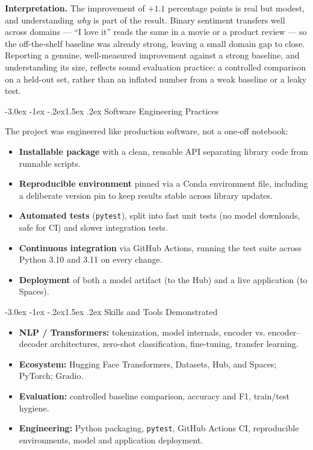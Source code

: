 \documentclass[11pt]{article}
\makeatletter
\newcommand{\code}[1]{\texttt{\small #1}}
\renewcommand{\section}{\@startsection{section}{1}{\z@}%
  {-3.0ex \@plus -1ex \@minus -.2ex}{1.5ex \@plus.2ex}%
  {\Large\bfseries\color{primarycolor}}}
\makeatother
\begin{document}
\textbf{Interpretation.} The improvement of $+1.1$ percentage points is real but
modest, and understanding \emph{why} is part of the result. Binary sentiment
transfers well across domains --- ``I love it'' reads the same in a movie or a
product review --- so the off-the-shelf baseline was already strong, leaving a
small domain gap to close. Reporting a genuine, well-measured improvement against
a strong baseline, and understanding its size, reflects sound evaluation
practice: a controlled comparison on a held-out set, rather than an inflated
number from a weak baseline or a leaky test.

\section{Software Engineering Practices}

The project was engineered like production software, not a one-off notebook:
\begin{itemize}
    \item \textbf{Installable package} with a clean, reusable API separating
    library code from runnable scripts.
    \item \textbf{Reproducible environment} pinned via a Conda environment file,
    including a deliberate version pin to keep results stable across library
    updates.
    \item \textbf{Automated tests} (\code{pytest}), split into fast unit tests
    (no model downloads, safe for CI) and slower integration tests.
    \item \textbf{Continuous integration} via GitHub Actions, running the test
    suite across Python 3.10 and 3.11 on every change.
    \item \textbf{Deployment} of both a model artifact (to the Hub) and a live
    application (to Spaces).
\end{itemize}

\section{Skills and Tools Demonstrated}

\begin{itemize}
    \item \textbf{NLP / Transformers:} tokenization, model internals, encoder vs.
    encoder--decoder architectures, zero-shot classification, fine-tuning,
    transfer learning.
    \item \textbf{Ecosystem:} Hugging Face Transformers, Datasets, Hub, and
    Spaces; PyTorch; Gradio.
    \item \textbf{Evaluation:} controlled baseline comparison, accuracy and F1,
    train/test hygiene.
    \item \textbf{Engineering:} Python packaging, \code{pytest}, GitHub Actions
    CI, reproducible environments, model and application deployment.
\end{itemize}
\end{document}
